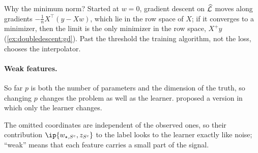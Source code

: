 \begin{refsection}
Why the minimum norm? Started at $w=0$, gradient descent on $\widehat{\mathcal{L}}$ moves along gradients $-\frac1nX^\top(y-Xw)$, which lie in the row space of $X$; if it converges to a minimizer, then the limit is the only minimizer in the row space, $X^+y$ (\cref{ex:doubledescent:gd}). Past the threshold the training algorithm, not the loss, chooses the interpolator.

\paragraph{Weak features.} So far $p$ is both the number of parameters and the dimension of the truth, so changing $p$ changes the problem as well as the learner. \Textcite{BelkinEtAl2020} proposed a version in which only the learner changes.


The omitted coordinates are independent of the observed ones, so their contribution $\ip{w_{\star,S^c},z_{S^c}}$ to the label looks to the learner exactly like noise; ``weak'' means that each feature carries a small part of the signal.


\end{refsection}
